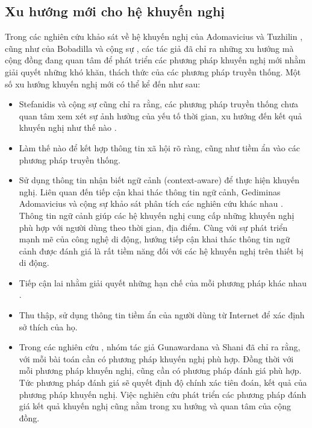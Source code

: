 \subsection{Xu hướng mới cho hệ khuyến nghị}
Trong các nghiên cứu khảo sát về hệ khuyến nghị của Adomavicius và Tuzhilin \cite{Adomavicius:2005:TNG:1070611.1070751}, cũng như của Bobadilla và cộng sự \cite{Bobadilla2013109}, các tác giả đã chỉ ra những xu hướng mà cộng đồng đang quan tâm để phát triển các phương pháp khuyến nghị mới nhằm giải quyết những khó khăn, thách thức của các phương pháp truyền thống. Một số xu hướng khuyến nghị mới có thể kể đến như sau:
\begin{itemize}
\item Stefanidis và cộng sự cũng chỉ ra rằng, các phương pháp truyền thống chưa quan tâm xem xét sự ảnh hưởng của yếu tố thời gian, xu hướng đến kết quả khuyến nghị như thế nào \cite{StefanidisNNK12}.
\item Làm thế nào để kết hợp thông tin xã hội rõ ràng, cũng như tiềm ẩn vào các phương pháp truyền thống. 
\item Sử dụng thông tin nhận biết ngữ cảnh (context-aware) để thực hiện khuyến nghị. Liên quan đến tiếp cận khai thác thông tin ngữ cảnh, Gediminas Adomavicius và cộng sự khảo sát phân tích các nghiên cứu khác nhau \cite{AdomaviciusMRT11, AdomaviciusT11}. Thông tin ngữ cảnh giúp các hệ khuyến nghị cung cấp những khuyến nghị phù hợp với người dùng theo thời gian, địa điểm. Cùng với sự phát triển mạnh mẽ của công nghệ di động, hướng tiếp cận khai thác thông tin ngữ cảnh được đánh giá là rất tiềm năng đối với các hệ khuyến nghị trên thiết bị di động.
\item Tiếp cận lai nhằm giải quyết những hạn chế của mỗi phương pháp khác nhau \cite{Robin:2002:HybridRS_Survey, Adomavicius:2005:TNG:1070611.1070751, Bobadilla2013109}.
\item Thu thập, sử dụng thông tin tiềm ẩn của người dùng từ Internet để xác định sở thích của họ.
\item Trong các nghiên cứu \cite{GunawardanaS09, ShaniG11, ShaniG13}, nhóm tác giả Gunawardana và Shani đã chỉ ra rằng, với mỗi bài toán cần có phương pháp khuyến nghị phù hợp. Đồng thời với mỗi phương pháp khuyến nghị, cũng cần có phương pháp đánh giá phù hợp. Tức phương pháp đánh giá sẽ quyết định độ chính xác tiên đoán, kết quả của phương pháp khuyến nghị. Việc nghiên cứu phát triển các phương pháp đánh giá kết quả khuyến nghị cũng nằm trong xu hướng và quan tâm của cộng đồng.
\end{itemize}

